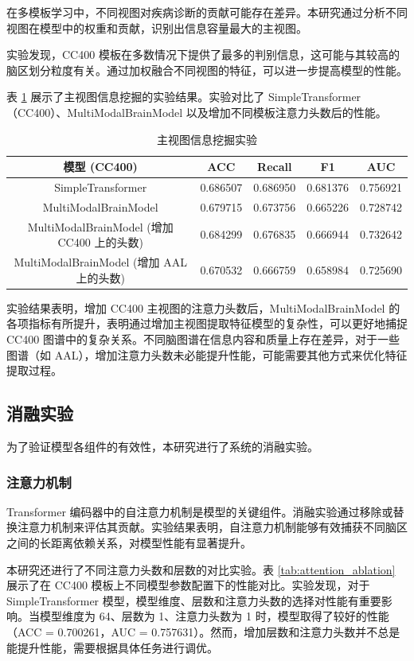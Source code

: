 \documentclass[12pt,a4paper]{article}
\begin{document}
在多模板学习中，不同视图对疾病诊断的贡献可能存在差异。本研究通过分析不同视图在模型中的权重和贡献，识别出信息容量最大的主视图。

实验发现，CC400 模板在多数情况下提供了最多的判别信息，这可能与其较高的脑区划分粒度有关。通过加权融合不同视图的特征，可以进一步提高模型的性能。

表 \ref{tab:main_view} 展示了主视图信息挖掘的实验结果。实验对比了 SimpleTransformer（CC400）、MultiModalBrainModel 以及增加不同模板注意力头数后的性能。

\begin{table}[H]
\centering
\caption{主视图信息挖掘实验}
\label{tab:main_view}
\begin{tabular}{ccccc}
\toprule
模型 (CC400) & ACC & Recall & F1 & AUC \\
\midrule
SimpleTransformer & 0.686507 & 0.686950 & 0.681376 & 0.756921 \\
MultiModalBrainModel & 0.679715 & 0.673756 & 0.665226 & 0.728742 \\
MultiModalBrainModel (增加 CC400 上的头数) & 0.684299 & 0.676835 & 0.666944 & 0.732642 \\
MultiModalBrainModel (增加 AAL 上的头数) & 0.670532 & 0.666759 & 0.658984 & 0.725690 \\
\bottomrule
\end{tabular}
\end{table}

实验结果表明，增加 CC400 主视图的注意力头数后，MultiModalBrainModel 的各项指标有所提升，表明通过增加主视图提取特征模型的复杂性，可以更好地捕捉 CC400 图谱中的复杂关系。不同脑图谱在信息内容和质量上存在差异，对于一些图谱（如 AAL），增加注意力头数未必能提升性能，可能需要其他方式来优化特征提取过程。

\subsection{消融实验}

为了验证模型各组件的有效性，本研究进行了系统的消融实验。

\subsubsection{注意力机制}

Transformer 编码器中的自注意力机制是模型的关键组件。消融实验通过移除或替换注意力机制来评估其贡献。实验结果表明，自注意力机制能够有效捕获不同脑区之间的长距离依赖关系，对模型性能有显著提升。

本研究还进行了不同注意力头数和层数的对比实验。表 \ref{tab:attention_ablation} 展示了在 CC400 模板上不同模型参数配置下的性能对比。实验发现，对于 SimpleTransformer 模型，模型维度、层数和注意力头数的选择对性能有重要影响。当模型维度为 64、层数为 1、注意力头数为 1 时，模型取得了较好的性能（ACC = 0.700261，AUC = 0.757631）。然而，增加层数和注意力头数并不总是能提升性能，需要根据具体任务进行调优。
\end{document}
